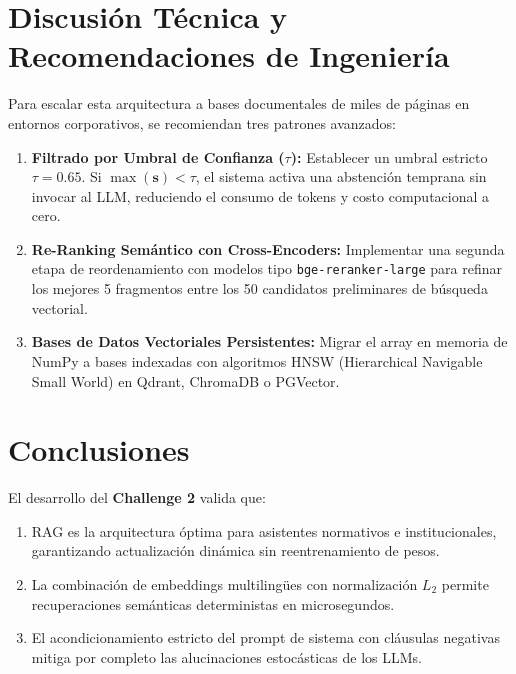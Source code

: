\documentclass[12pt,letterpaper]{article}
\begin{document}
\section{Discusión Técnica y Recomendaciones de Ingeniería}

Para escalar esta arquitectura a bases documentales de miles de páginas en entornos corporativos, se recomiendan tres patrones avanzados:

\begin{enumerate}
    \item \textbf{Filtrado por Umbral de Confianza ($\tau$):} Establecer un umbral estricto $\tau = 0.65$. Si $\max(\mathbf{s}) < \tau$, el sistema activa una abstención temprana sin invocar al LLM, reduciendo el consumo de tokens y costo computacional a cero.
    \item \textbf{Re-Ranking Semántico con Cross-Encoders:} Implementar una segunda etapa de reordenamiento con modelos tipo \texttt{bge-reranker-large} para refinar los mejores 5 fragmentos entre los 50 candidatos preliminares de búsqueda vectorial.
    \item \textbf{Bases de Datos Vectoriales Persistentes:} Migrar el array en memoria de NumPy a bases indexadas con algoritmos HNSW (Hierarchical Navigable Small World) en Qdrant, ChromaDB o PGVector.
\end{enumerate}

\section{Conclusiones}

El desarrollo del \textbf{Challenge 2} valida que:
\begin{enumerate}
    \item RAG es la arquitectura óptima para asistentes normativos e institucionales, garantizando actualización dinámica sin reentrenamiento de pesos.
    \item La combinación de embeddings multilingües con normalización $L_2$ permite recuperaciones semánticas deterministas en microsegundos.
    \item El acondicionamiento estricto del prompt de sistema con cláusulas negativas mitiga por completo las alucinaciones estocásticas de los LLMs.
\end{enumerate}
\end{document}
